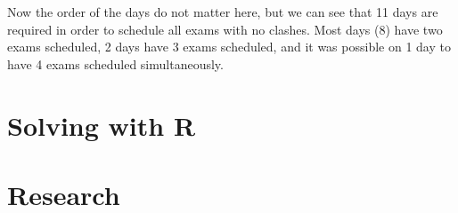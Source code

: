 Now the order of the days do not matter here, but we can see that 11 days are
required in order to schedule all exams with no clashes. Most days (8) have two
exams scheduled, 2 days have 3 exams scheduled, and it was possible on 1 day to
have 4 exams scheduled simultaneously.


\section{Solving with R}\label{sec:solving-with-R}

\section{Research}\label{sec:research}
